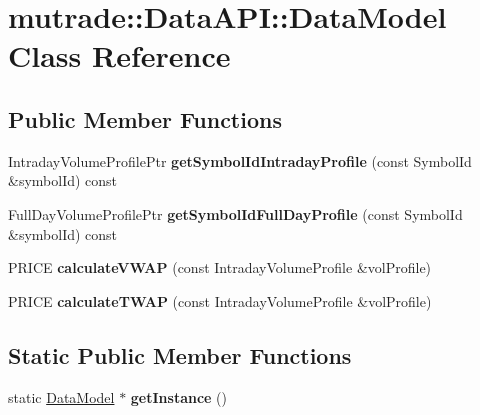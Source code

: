 \hypertarget{classmutrade_1_1_data_a_p_i_1_1_data_model}{\section{mutrade\-:\-:Data\-A\-P\-I\-:\-:Data\-Model Class Reference}
\label{classmutrade_1_1_data_a_p_i_1_1_data_model}
}
\subsection*{Public Member Functions}
\begin{DoxyCompactItemize}
\item 
\hypertarget{classmutrade_1_1_data_a_p_i_1_1_data_model_ae0850426cf58b0b48dfe5bca4cd4b5ee}{Intraday\-Volume\-Profile\-Ptr {\bfseries get\-Symbol\-Id\-Intraday\-Profile} (const Symbol\-Id \&symbol\-Id) const }\label{classmutrade_1_1_data_a_p_i_1_1_data_model_ae0850426cf58b0b48dfe5bca4cd4b5ee}

\item 
\hypertarget{classmutrade_1_1_data_a_p_i_1_1_data_model_a165a98d23069a0afa75be112c3cc44f2}{Full\-Day\-Volume\-Profile\-Ptr {\bfseries get\-Symbol\-Id\-Full\-Day\-Profile} (const Symbol\-Id \&symbol\-Id) const }\label{classmutrade_1_1_data_a_p_i_1_1_data_model_a165a98d23069a0afa75be112c3cc44f2}

\item 
\hypertarget{classmutrade_1_1_data_a_p_i_1_1_data_model_a44f60b3ccc0f740d39a048df293068a8}{P\-R\-I\-C\-E {\bfseries calculate\-V\-W\-A\-P} (const Intraday\-Volume\-Profile \&vol\-Profile)}\label{classmutrade_1_1_data_a_p_i_1_1_data_model_a44f60b3ccc0f740d39a048df293068a8}

\item 
\hypertarget{classmutrade_1_1_data_a_p_i_1_1_data_model_aeab31dd3f08340e513238d5ef0874cc5}{P\-R\-I\-C\-E {\bfseries calculate\-T\-W\-A\-P} (const Intraday\-Volume\-Profile \&vol\-Profile)}\label{classmutrade_1_1_data_a_p_i_1_1_data_model_aeab31dd3f08340e513238d5ef0874cc5}

\end{DoxyCompactItemize}
\subsection*{Static Public Member Functions}
\begin{DoxyCompactItemize}
\item 
\hypertarget{classmutrade_1_1_data_a_p_i_1_1_data_model_a107d5acc62ce7a0a93ccace95a85f402}{static \hyperlink{classmutrade_1_1_data_a_p_i_1_1_data_model}{Data\-Model} $\ast$ {\bfseries get\-Instance} ()}\label{classmutrade_1_1_data_a_p_i_1_1_data_model_a107d5acc62ce7a0a93ccace95a85f402}

\end{DoxyCompactItemize}
